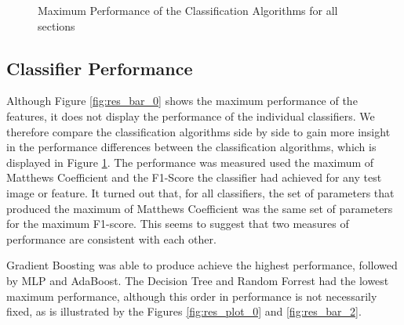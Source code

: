 \begin{figure}[]
	\caption{Maximum Performance of the Classification Algorithms for all sections}
	\label{fig:res_bar_1}
\end{figure}

\subsection{Classifier Performance}

Although Figure \ref{fig:res_bar_0} shows the maximum performance of the features, it does not display the performance of the individual classifiers. We therefore compare the classification algorithms side by side to gain more insight in the performance differences between the classification algorithms, which is displayed in Figure \ref{fig:res_bar_1}. The performance was measured used the maximum of Matthews Coefficient and the F1-Score the classifier had achieved for any test image or feature. It turned out that, for all classifiers, the set of parameters that produced the maximum of Matthews Coefficient was the same set of parameters for the maximum F1-score. This seems to suggest that two measures of performance are consistent with each other.

Gradient Boosting was able to produce achieve the highest performance, followed by MLP and AdaBoost. The Decision Tree and Random Forrest had the lowest maximum performance, although this order in performance is not necessarily fixed, as is illustrated by the Figures \ref{fig:res_plot_0} and \ref{fig:res_bar_2}.




